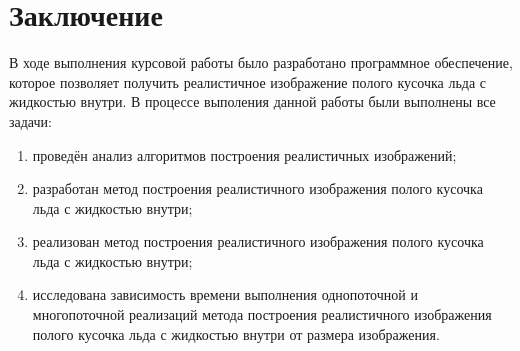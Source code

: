 \chapter*{Заключение}

В ходе выполнения курсовой работы было разработано программное обеспечение, которое позволяет получить реалистичное изображение полого кусочка льда с жидкостью внутри.
В процессе выполения данной работы были выполнены все задачи:
\begin{enumerate}[label=\arabic*)]
    \item проведён анализ алгоритмов построения реалистичных изображений;
    \item разработан метод построения реалистичного изображения полого кусочка льда с жидкостью внутри;
    \item реализован метод построения реалистичного изображения полого кусочка льда с жидкостью внутри;
    \item исследована зависимость времени выполнения однопоточной и многопоточной реализаций метода построения реалистичного изображения полого кусочка льда с жидкостью внутри от размера изображения.
\end{enumerate}
